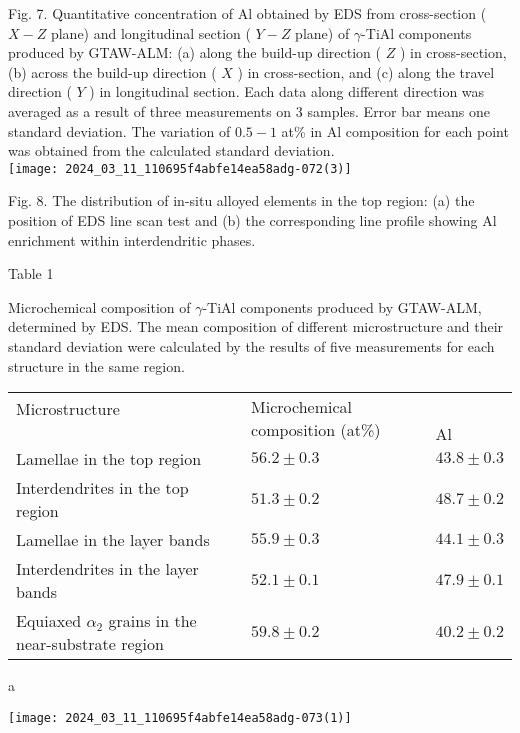 \documentclass[10pt]{article}
\begin{document}
Fig. 7. Quantitative concentration of Al obtained by EDS from cross-section ( $X-Z$ plane) and longitudinal section ( $Y-Z$ plane) of $\gamma$-TiAl components produced by GTAW-ALM: (a) along the build-up direction ( $Z$ ) in cross-section, (b) across the build-up direction ( $X$ ) in cross-section, and (c) along the travel direction ( $Y$ ) in longitudinal section. Each data along different direction was averaged as a result of three measurements on 3 samples. Error bar means one standard deviation. The variation of $0.5-1$ at\% in $\mathrm{Al}$ composition for each point was obtained from the calculated standard deviation.\\
\texttt{[image: 2024\_03\_11\_110695f4abfe14ea58adg-072(3)]}

Fig. 8. The distribution of in-situ alloyed elements in the top region: (a) the position of EDS line scan test and (b) the corresponding line profile showing Al enrichment within interdendritic phases.

Table 1

Microchemical composition of $\gamma$-TiAl components produced by GTAW-ALM, determined by EDS. The mean composition of different microstructure and their standard deviation were calculated by the results of five measurements for each structure in the same region.

\begin{center}
\begin{tabular}{lll}
\hline
Microstructure & \multirow{2}{*}{Microchemical composition (at\%)} &  \\
\cline { 2 - 3 }
 &  & $\mathrm{Al}$ \\
\hline
Lamellae in the top region & $56.2 \pm 0.3$ & $43.8 \pm 0.3$ \\
Interdendrites in the top region & $51.3 \pm 0.2$ & $48.7 \pm 0.2$ \\
Lamellae in the layer bands & $55.9 \pm 0.3$ & $44.1 \pm 0.3$ \\
Interdendrites in the layer bands & $52.1 \pm 0.1$ & $47.9 \pm 0.1$ \\
Equiaxed $\alpha_{2}$ grains in the near-substrate region & $59.8 \pm 0.2$ & $40.2 \pm 0.2$ \\
\hline
\end{tabular}
\end{center}

a

\begin{center}
\texttt{[image: 2024\_03\_11\_110695f4abfe14ea58adg-073(1)]}
\end{center}
\end{document}
